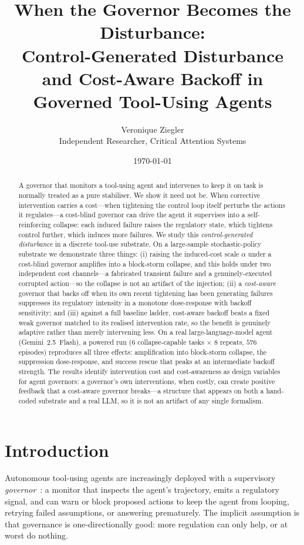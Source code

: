 \documentclass[11pt]{article}
\title{\textbf{When the Governor Becomes the Disturbance:}\\[0.3em]
Control-Generated Disturbance and Cost-Aware Backoff in Governed Tool-Using Agents}
\author{Veronique Ziegler\\Independent Researcher, Critical Attention Systems}
\date{\today}
\newcommand{\poweredTasks}{6}
\newcommand{\poweredRepeats}{8}
\newcommand{\poweredEpisodes}{576}
\begin{document}
\maketitle

\begin{abstract}
A governor that monitors a tool-using agent and intervenes to keep it on task
is normally treated as a pure stabiliser. We show it need not be. When
corrective intervention carries a cost---when tightening the control loop
itself perturbs the actions it regulates---a cost-blind governor can drive the
agent it supervises into a self-reinforcing collapse: each induced failure
raises the regulatory state, which tightens control further, which induces more
failures. We study this \emph{control-generated disturbance} in a discrete
tool-use substrate. On a large-sample stochastic-policy substrate we
demonstrate three things: (i) raising the induced-cost scale $\alpha$ under a
cost-blind governor amplifies into a block-storm collapse, and this holds under
two independent cost channels---a fabricated transient failure and a
genuinely-executed corrupted action---so the collapse is not an artifact of the
injection; (ii) a \emph{cost-aware} governor that backs off when its own recent
tightening has been generating failures suppresses its regulatory intensity in
a monotone dose-response with backoff sensitivity; and (iii) against a full
baseline ladder, cost-aware backoff beats a fixed weak governor matched to its
realised intervention rate, so the benefit is genuinely adaptive rather than
merely intervening less. On a real large-language-model agent
(Gemini~2.5~Flash), a powered run ($\poweredTasks$ collapse-capable tasks
$\times$ $\poweredRepeats$ repeats, $\poweredEpisodes$ episodes) reproduces all
three effects: amplification into block-storm collapse, the suppression
dose-response, and success rescue that peaks at an intermediate backoff
strength. The results identify intervention cost
and cost-awareness as design variables for agent governors: a governor's own
interventions, when costly, can create positive feedback that a cost-aware
governor breaks---a structure that appears on both a hand-coded substrate and a
real LLM, so it is not an artifact of any single formalism.
\end{abstract}

\section{Introduction}

Autonomous tool-using agents are increasingly deployed with a supervisory
\emph{governor}~\cite{astrom2008feedback}: a monitor that inspects the agent's
trajectory, emits a regulatory signal, and can warn or block proposed actions
to keep the agent
from looping, retrying failed assumptions, or answering prematurely. The
implicit assumption is that governance is one-directionally good: more
regulation can only help, or at worst do nothing.
\end{document}
